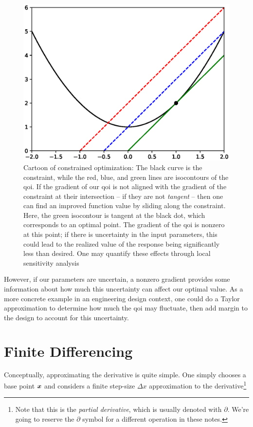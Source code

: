 \documentclass[../primer.tex]{subfiles}
\begin{document}
\begin{figure}[!ht]
  \centering
  \includegraphics{./images/ex2}
  \caption{Cartoon of constrained optimization: The black curve is the
    constraint, while the red, blue, and green lines are isocontours of
    the qoi. If the gradient of our qoi is not aligned with the gradient
    of the constraint at their intersection -- if they are not \emph{tangent}
    -- then one can find an improved function value by sliding along the
    constraint. Here, the green isocontour is tangent at the black dot,
    which corresponds to an optimal point. The gradient of the qoi is
    nonzero at this point; if there is uncertainty in the input parameters,
    this could lead to the realized value of the response being significantly
    less than desired. One may quantify these effects through local sensitivity
    analysis}
  \label{fig:opt}
\end{figure}

However, if our parameters are uncertain, a nonzero gradient provides some
information about how much this uncertainty can affect our optimal value. As a
more concrete example in an engineering design context, one could do a Taylor
approximation to determine how much the qoi may fluctuate, then add margin to
the design to account for this uncertainty.

\section{Finite Differencing}
\label{sec:org90b543e}
Conceptually, approximating the derivative is quite simple. One simply chooses a
base point \(\boldsymbol{x}\) and considers a finite step-size \(\Delta x\) approximation to
the derivative\footnote{Note that this is the \emph{partial derivative}, which is
usually denoted with \(\partial\). We're going to reserve the \(\partial\) symbol
for a different operation in these notes.}
\end{document}
